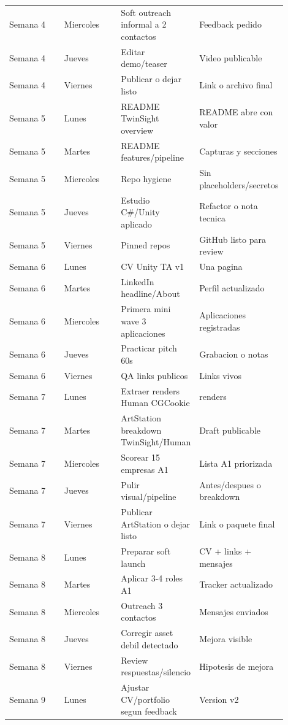 \begin{center}
\begin{longtable}{>{\raggedright\arraybackslash}p{0.225\linewidth} >{\raggedright\arraybackslash}p{0.225\linewidth} >{\raggedright\arraybackslash}p{0.225\linewidth} >{\raggedright\arraybackslash}p{0.225\linewidth}}
Semana 4 & Miercoles & Soft outreach informal a 2 contactos & Feedback pedido \\
Semana 4 & Jueves & Editar demo/teaser & Video publicable \\
Semana 4 & Viernes & Publicar o dejar listo & Link o archivo final \\
Semana 5 & Lunes & README TwinSight overview & README abre con valor \\
Semana 5 & Martes & README features/pipeline & Capturas y secciones \\
Semana 5 & Miercoles & Repo hygiene & Sin placeholders/secretos \\
Semana 5 & Jueves & Estudio C\#/Unity aplicado & Refactor o nota tecnica \\
Semana 5 & Viernes & Pinned repos & GitHub listo para review \\
Semana 6 & Lunes & CV Unity TA v1 & Una pagina \\
Semana 6 & Martes & LinkedIn headline/About & Perfil actualizado \\
Semana 6 & Miercoles & Primera mini wave 3 aplicaciones & Aplicaciones registradas \\
Semana 6 & Jueves & Practicar pitch 60s & Grabacion o notas \\
Semana 6 & Viernes & QA links publicos & Links vivos \\
Semana 7 & Lunes & Extraer renders Human CGCookie & 3 renders \\
Semana 7 & Martes & ArtStation breakdown TwinSight/Human & Draft publicable \\
Semana 7 & Miercoles & Scorear 15 empresas A1 & Lista A1 priorizada \\
Semana 7 & Jueves & Pulir visual/pipeline & Antes/despues o breakdown \\
Semana 7 & Viernes & Publicar ArtStation o dejar listo & Link o paquete final \\
Semana 8 & Lunes & Preparar soft launch & CV + links + mensajes \\
Semana 8 & Martes & Aplicar 3-4 roles A1 & Tracker actualizado \\
Semana 8 & Miercoles & Outreach 3 contactos & Mensajes enviados \\
Semana 8 & Jueves & Corregir asset debil detectado & Mejora visible \\
Semana 8 & Viernes & Review respuestas/silencio & Hipotesis de mejora \\
Semana 9 & Lunes & Ajustar CV/portfolio segun feedback & Version v2 \\

\end{longtable}
\end{center}
